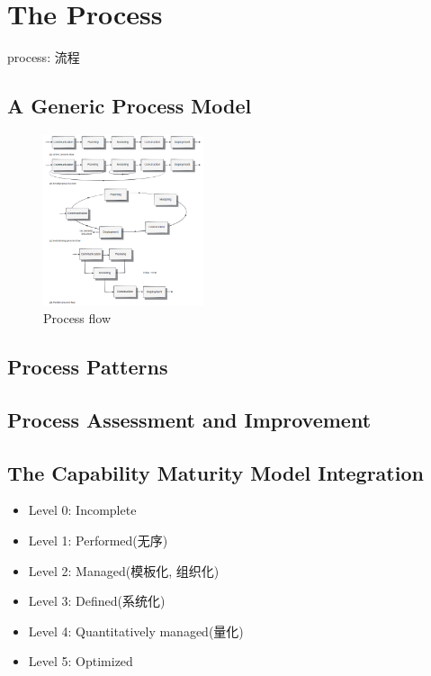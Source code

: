 \newpage
\section{The Process}
process: 流程
\subsection{A Generic Process Model}
\begin{figure}[!htb]
    \centering
    \includegraphics[width=0.42\textwidth]{pic/SE2/Process flow}
    \caption{Process flow}
\end{figure}

\subsection{Process Patterns}

\subsection{Process Assessment and Improvement}



\subsection[CMMI]{The Capability Maturity Model Integration}
\begin{itemize}
    \item Level 0: Incomplete
    \item Level 1: Performed(无序)
    \item Level 2: Managed(模板化, 组织化)
    \item Level 3: Defined(系统化)
    \item Level 4: Quantitatively managed(量化)
    \item Level 5: Optimized
\end{itemize}

